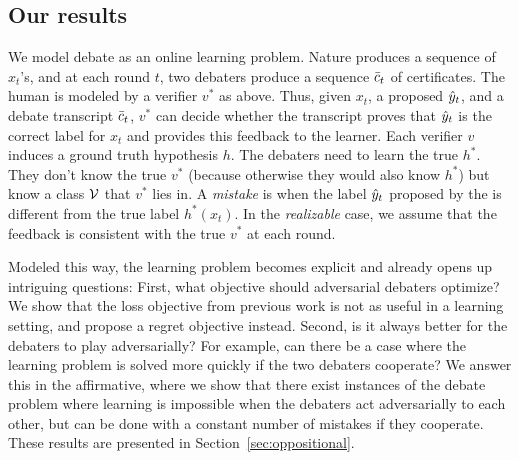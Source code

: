 
\subsection{Our results}
We model debate as an online learning problem. Nature produces a sequence of $x_t$'s, and at each round $t$, two debaters produce a sequence $\sc_t$ of certificates. The human is modeled by a verifier $v^*$ as above. Thus, given $x_t$, a proposed $\hy_t$, and a debate transcript $\sc_t$, $v^*$ can decide whether the transcript proves that $\hy_t$ is the correct label for $x_t$ and provides this feedback to the learner. Each verifier $v$ induces a ground truth hypothesis $h$. The debaters need to learn the true $h^*$. They don't know the true $v^*$ (because otherwise they would also know $h^*$) but know a class $\V$ that $v^*$ lies in. A \emph{mistake} is when the label $\hy_t$ proposed by the \dt is different from the true label $h^*(x_t)$. In the \emph{realizable} case, we assume that  the feedback is consistent with the true $v^*$ at each round.

Modeled this way, the learning problem becomes explicit and already opens up intriguing questions: First, what objective should adversarial debaters optimize? We show that the loss objective from previous work is not as useful in a learning setting, and propose a regret objective instead. Second, is it always better for the debaters to play adversarially? For example, can there be a case where the learning problem is solved more quickly if the two debaters cooperate? We answer this in the affirmative, where we show that there exist instances of the debate problem where learning is impossible when the debaters act adversarially to each other, but can be done with a constant number of mistakes if they cooperate. These results are presented in Section~\ref{sec:oppositional}.

